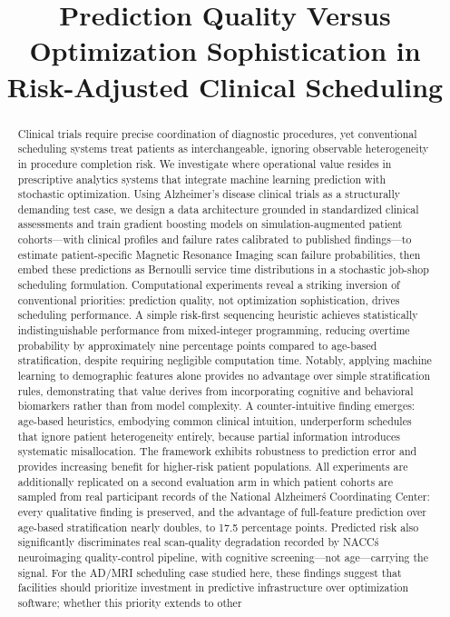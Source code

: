 \documentclass[11pt,a4paper]{article}
\title{Prediction Quality Versus Optimization Sophistication in Risk-Adjusted Clinical Scheduling}
\date{}
\newcommand{\rev}[1]{{\color{red}#1}}
\begin{document}
\sloppy
\maketitle


\begin{abstract}
Clinical trials require precise coordination of diagnostic procedures, yet conventional scheduling systems treat patients as interchangeable, ignoring observable heterogeneity in procedure completion risk. We investigate where operational value resides in prescriptive analytics systems that integrate machine learning prediction with stochastic optimization. Using Alzheimer's disease clinical trials as a structurally demanding test case, we design a data architecture grounded in standardized clinical assessments and train gradient boosting models on simulation-augmented patient cohorts---with clinical profiles and failure rates calibrated to published findings---to estimate patient-specific Magnetic Resonance Imaging scan failure probabilities, then embed these predictions as Bernoulli service time distributions in a stochastic job-shop scheduling formulation. Computational experiments reveal a striking inversion of conventional priorities: prediction quality, not optimization sophistication, drives scheduling performance. A simple risk-first sequencing heuristic achieves statistically indistinguishable performance from mixed-integer programming, reducing overtime probability by approximately nine percentage points compared to age-based stratification, despite requiring negligible computation time. Notably, applying machine learning to demographic features alone provides no advantage over simple stratification rules, demonstrating that value derives from incorporating cognitive and behavioral biomarkers rather than from model complexity. A counter-intuitive finding emerges: age-based heuristics, embodying common clinical intuition, underperform schedules that ignore patient heterogeneity entirely, because partial information introduces systematic misallocation. The framework exhibits robustness to prediction error and provides increasing benefit for higher-risk patient populations. \rev{All experiments are additionally replicated on a second evaluation arm in which patient cohorts are sampled from real participant records of the National Alzheimer\'s Coordinating Center: every qualitative finding is preserved, and the advantage of full-feature prediction over age-based stratification nearly doubles, to 17.5 percentage points. Predicted risk also significantly discriminates real scan-quality degradation recorded by NACC\'s neuroimaging quality-control pipeline, with cognitive screening---not age---carrying the signal.} For the AD/MRI scheduling case studied here, these findings suggest that facilities should prioritize investment in predictive infrastructure over optimization software; whether this priority extends to other 
\end{abstract}
\end{document}
